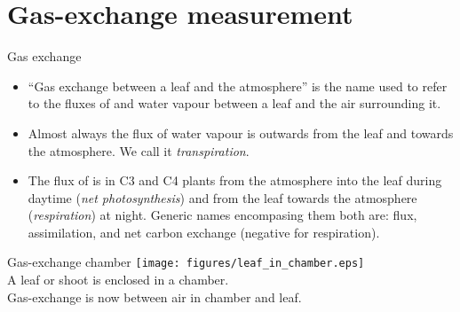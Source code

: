 \documentclass[10pt]{beamer}
\begin{document}
\section{Gas-exchange measurement}

\begin{frame}{Gas exchange}
    \begin{itemize}
        \item ``Gas exchange between a leaf and the atmosphere'' is
        the name used to refer to the fluxes of \COtwo and water
        vapour between a leaf and the air surrounding it.
        \item Almost always the flux of water vapour is outwards
        from the leaf and towards the atmosphere. We call it
        \emph{transpiration}.
        \item The flux of \COtwo is in C3 and C4 plants from the
        atmosphere into the leaf during daytime
        (\emph{net photosynthesis}) and from the leaf towards the
        atmosphere (\emph{respiration}) at night. Generic names encompasing them both are:
        \COtwo flux, assimilation, and net carbon exchange (negative for respiration).
    \end{itemize}
\end{frame}

\begin{frame}{Gas-exchange chamber}
    \centering
    \texttt{[image: figures/leaf\_in\_chamber.eps]}\\
    {\small A leaf or shoot is enclosed in a chamber.\\
    Gas-exchange is now between air in chamber and leaf.}
\end{frame}
\end{document}
